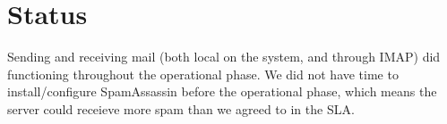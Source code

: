 \section{Status}
Sending and receiving mail (both local on the system, and through IMAP)
did functioning throughout the operational phase.
We did not have time to install/configure SpamAssassin before the
operational phase, which means the server could receieve more spam than
we agreed to in the SLA.
